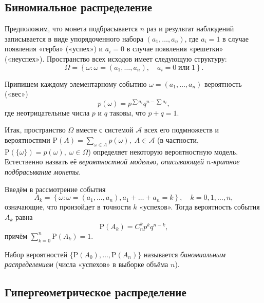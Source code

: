 \documentclass[11pt,a4paper]{article}
\begin{document}
    \hypertarget{ux431ux438ux43dux43eux43cux438ux430ux43bux44cux43dux43eux435-ux440ux430ux441ux43fux440ux435ux434ux435ux43bux435ux43dux438ux435}{%
\subsection{Биномиальное
распределение}\label{ux431ux438ux43dux43eux43cux438ux430ux43bux44cux43dux43eux435-ux440ux430ux441ux43fux440ux435ux434ux435ux43bux435ux43dux438ux435}}

Предположим, что монета подбрасывается \(n\) раз и результат наблюдений
записывается в виде упорядоченного набора \((a_1, \ldots, a_n)\), где
\(a_i = 1\) в случае появления «герба» («успех») и \(a_i = 0\) в случае
появления «решетки» («неуспех»). Пространство всех исходов имеет
следующую структуру:
\[ \Omega= \left\{ \omega: \omega = (a_1, \ldots, a_n), \quad a_i = 0 \; \mathrm{или} \; 1 \right\}. \]

Припишем каждому элементарному событию \(\omega = (a_1, \ldots, a_n)\)
вероятность («вес») \[ p(\omega) = p^{\sum a_i} q^{n-\sum a_i}, \] где
неотрицательные числа \(p\) и \(q\) таковы, что \(p + q = 1\).

Итак, пространство \(\Omega\) вместе с системой \(\mathcal{A}\) всех его
подмножеств и вероятностями
\(\mathrm{P}(A) = \sum\limits_{\omega \in A}p(\omega), \; A \in \mathcal{A}\)
(в частности,
\(\mathrm{P}(\{\omega\}) = p(\omega), \; \omega \in \Omega\)) определяет
некоторую вероятностную модель. Естественно назвать её
\emph{вероятностной моделью, описывающей \(n\)-кратное подбрасывание
монеты}.

Введём в рассмотрение события \[ 
    A_k = \left\{\omega: \omega=(a_1, \ldots, a_n), a_1 + \ldots + a_n = k\right\}, \quad k = 0, 1, \ldots, n,
\] означающие, что произойдет в точности \(k\) «успехов». Тогда
вероятность события \(A_k\) равна
\[ \mathrm{P}(A_k) = C_n^k p^k q^{n-k}, \] причём
\(\sum\limits_{k=0}^n \mathrm{P}(A_k) = 1\).

Набор вероятностей \(\{\mathrm{P}(A_0), \ldots,\mathrm{P}(A_n)\}\)
называется \emph{биномиальным распределением} (числа «успехов» в выборке
объёма \(n\)).

    \hypertarget{ux433ux438ux43fux435ux440ux433ux435ux43eux43cux435ux442ux440ux438ux447ux435ux441ux43aux43eux435-ux440ux430ux441ux43fux440ux435ux434ux435ux43bux435ux43dux438ux435}{%
\subsection{Гипергеометрическое
распределение}\label{ux433ux438ux43fux435ux440ux433ux435ux43eux43cux435ux442ux440ux438ux447ux435ux441ux43aux43eux435-ux440ux430ux441ux43fux440ux435ux434ux435ux43bux435ux43dux438ux435}}
\end{document}
